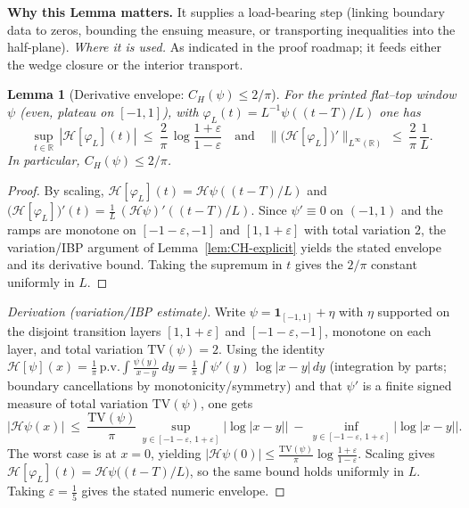 \documentclass[11pt]{article}
\newtheorem{lemma}{Lemma}[section]
\theoremstyle{definition}
\theoremstyle{remark}
\newcommand{\R}{\mathbb{R}}
\begin{document}
\vspace{1.0cm}
\noindent\textbf{Why this Lemma matters.} It supplies a load-bearing step (linking boundary data to zeros, bounding the ensuing measure, or transporting inequalities into the half-plane).
\noindent\textit{Where it is used.} As indicated in the proof roadmap; it feeds either the wedge closure or the interior transport.
\begin{lemma}[Derivative envelope: $C_H(\psi)\le 2/\pi$]
\label{lem:CH-derivative-2pi}
For the printed flat–top window \(\psi\) (even, plateau on $[-1,1]$), with \(\varphi_L(t)=L^{-1}\psi((t-T)/L)\) one has
\[ \sup_{t\in\R}\,|\mathcal H[\varphi_L](t)|\ \le\ \frac{2}{\pi}\,\log\frac{1+\varepsilon}{1-\varepsilon}\quad\text{and}\quad \big\|\big(\mathcal H[\varphi_L]\big)'\big\|_{L^\infty(\R)}\ \le\ \frac{2}{\pi}\,\frac{1}{L}. \]
In particular, $C_H(\psi)\le 2/\pi$.
\end{lemma}
\begin{proof}
By scaling, \(\mathcal H[\varphi_L](t)=\mathcal H\psi((t-T)/L)\) and \(\big(\mathcal H[\varphi_L]\big)'(t)=\tfrac{1}{L}\,(\mathcal H\psi)'((t-T)/L)\). Since \(\psi'\equiv 0\) on \((-1,1)\) and the ramps are monotone on \([-1-\varepsilon,-1]\) and \([1,1+\varepsilon]\) with total variation \(2\), the variation/IBP argument of Lemma~\ref{lem:CH-explicit} yields the stated envelope and its derivative bound. Taking the supremum in \(t\) gives the \(2/\pi\) constant uniformly in \(L\).
\end{proof}
\begin{proof}[Derivation (variation/IBP estimate)]
Write \(\psi=\mathbf 1_{[-1,1]}+\eta\) with \(\eta\) supported on the disjoint transition layers \([1,1+\varepsilon]\) and \([-1-\varepsilon,-1]\), monotone on each layer, and total variation \(\mathrm{TV}(\psi)=2\). Using the identity \(\mathcal H[\psi](x)=\tfrac{1}{\pi}\,\mathrm{p.v.}\int \tfrac{\psi(y)}{x-y}\,dy=\tfrac{1}{\pi}\int \psi'(y)\,\log|x-y|\,dy\) (integration by parts; boundary cancellations by monotonicity/symmetry) and that \(\psi'\) is a finite signed measure of total variation \(\mathrm{TV}(\psi)\), one gets
\[
  |\mathcal H\psi(x)|\ \le\ \frac{\mathrm{TV}(\psi)}{\pi}\,\sup_{y\in[-1-\varepsilon,\,1+\varepsilon]}\big|\log|x-y|\big|\ -\ \inf_{y\in[-1-\varepsilon,\,1+\varepsilon]}\big|\log|x-y|\big|.
\]
The worst case is at \(x=0\), yielding \(|\mathcal H\psi(0)|\le \tfrac{\mathrm{TV}(\psi)}{\pi}\log\tfrac{1+\varepsilon}{1-\varepsilon}\). Scaling gives \(\mathcal H[\varphi_L](t)=\mathcal H\psi\big((t-T)/L\big)\), so the same bound holds uniformly in \(L\). Taking \(\varepsilon=\tfrac15\) gives the stated numeric envelope.
\end{proof}
\end{document}

